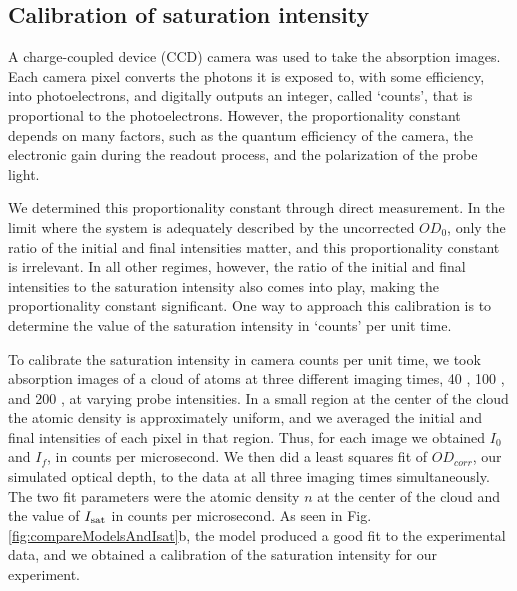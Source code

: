 \documentclass[12pt]{iopart}
\begin{document}
\subsection{Calibration of saturation intensity}
A charge-coupled device (CCD) camera was used to take the absorption images.  Each camera pixel  converts the photons it is exposed to, with some efficiency, into photoelectrons, and digitally outputs an integer, called `counts', that is proportional to the photoelectrons.  However, the proportionality constant depends on many factors, such as the quantum efficiency of the camera, the electronic gain during the readout process, and the polarization of the probe light. 
\par We determined this proportionality constant through direct measurement. In the limit where the system is adequately described by the uncorrected $OD_0$, only the ratio of the initial and final intensities matter, and this proportionality constant is irrelevant. In all other regimes, however, the ratio of the initial and final intensities to the saturation intensity also comes into play, making the proportionality constant significant. One way to approach this calibration is to determine the value of the saturation intensity in `counts' per unit time. 
\par To calibrate the saturation intensity in camera counts per unit time, we took absorption images of a cloud of \K{} atoms at three different imaging times, 40 \us{}, 100 \us{}, and 200 \us{}, at varying probe intensities. In a small region at the center of the cloud the atomic density is approximately uniform, and we averaged the initial and final intensities of each pixel in that region. Thus, for each image we obtained $I_0$ and $I_f$, in counts per microsecond. We then did a least squares fit of $OD_{corr}$, our simulated optical depth, to the data at all three imaging times simultaneously. The two fit parameters were the atomic density $n$ at the center of the cloud and the value of $I_{\rm{sat}}$ in counts per microsecond. As seen in Fig. \ref{fig:compareModelsAndIsat}b, the model produced a good fit to the experimental data, and we obtained a calibration of the saturation intensity for our experiment. 
\end{document}
